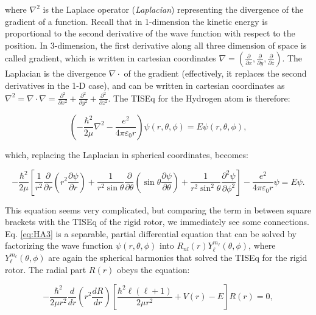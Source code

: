 \documentclass[
  9pt,
]{extbook}
\theoremstyle{definition}
\theoremstyle{definition}
\theoremstyle{definition}
\theoremstyle{remark}
\begin{document}
where \(\nabla^2\) is the Laplace operator (\emph{Laplacian}) representing the divergence of the gradient of a function. Recall that in 1-dimension the kinetic energy is proportional to the second derivative of the wave function with respect to the position. In 3-dimension, the first derivative along all three dimension of space is called gradient, which is written in cartesian coordinates \(\nabla = \left(\frac{\partial}{\partial x},\frac{\partial}{\partial y},\frac{\partial}{\partial z} \right)\). The Laplacian is the divergence \(\nabla \cdot\) of the gradient (effectively, it replaces the second derivatives in the 1-D case), and can be written in cartesian coordinates as \(\nabla^2=\nabla\cdot\nabla=\frac{\partial^2}{\partial x^2}+\frac{\partial^2}{\partial y^2}+\frac{\partial^2}{\partial z^2}\). The TISEq for the Hydrogen atom is therefore:

\begin{equation}
{\displaystyle \left(-{\frac {\hbar ^{2}}{2\mu }}\nabla ^{2}-{\frac {e^{2}}{4\pi \varepsilon _{0}r}}\right)\psi (r,\theta ,\phi )=E\psi (r,\theta ,\phi )},
\label{eq:HA2b}
\end{equation}

which, replacing the Laplacian in spherical coordinates, becomes:

\begin{equation}
-{\frac {\hbar ^{2}}{2\mu }}\left[{\frac {1}{r^{2}}}{\frac {\partial }{\partial r}}\left(r^{2}{\frac {\partial \psi }{\partial r}}\right)+{\frac {1}{r^{2}\sin \theta }}{\frac {\partial }{\partial \theta }}\left(\sin \theta {\frac {\partial \psi }{\partial \theta }}\right)+{\frac {1}{r^{2}\sin ^{2}\theta }}{\frac {\partial ^{2}\psi }{\partial \phi ^{2}}}\right]-{\frac {e^{2}}{4\pi \varepsilon _{0}r}}\psi =E\psi.
\label{eq:HA3}
\end{equation}

This equation seems very complicated, but comparing the term in between square brackets with the TISEq of the rigid rotor, we immediately see some connections. Eq. \eqref{eq:HA3} is a separable, partial differential equation that can be solved by factorizing the wave function \(\psi(r, \theta, \phi)\) into \(R_{nl}(r)Y_{\ell}^{m_{\ell}}(\theta, \phi)\), where \(Y_{\ell}^{m_{\ell}}(\theta, \phi)\) are again the spherical harmonics that solved the TISEq for the rigid rotor. The radial part \(R(r)\) obeys the equation:

\begin{equation}
- \frac{\hbar^2}{2 \mu r^2} \frac{d}{dr} \left( r^2 \frac{dR}{dr}
\right) \left[\frac{\hbar^2 \ell(\ell+1)}{2 \mu r^2} + V(r) - E \right] R(r) = 0,
\label{eq:HA4}
\end{equation}
\end{document}
